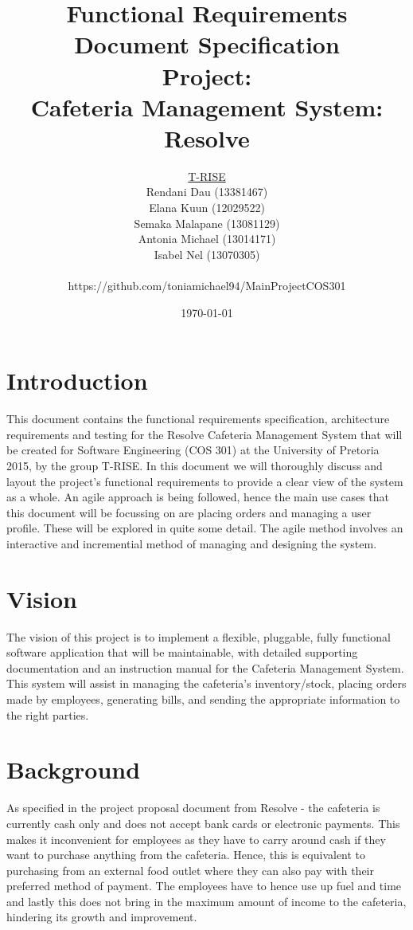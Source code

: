 \documentclass[a4paper,12pt]{article}
\title{\Huge Functional Requirements Document Specification \\ 
	 Project: \\ 
	Cafeteria Management System: Resolve}
\author{
         \underline{T-RISE}\\
          Rendani Dau (13381467) \\
	Elana Kuun (12029522) \\
	Semaka Malapane (13081129) \\
	Antonia Michael (13014171) \\
	Isabel Nel (13070305)\\ \\
	https://github.com/toniamichael94/MainProjectCOS301}
\date{\today}
\begin{document}
\maketitle
\break

\tableofcontents
\break


\section{Introduction}
This document contains the functional requirements specification, architecture requirements and testing for the Resolve Cafeteria Management System that will be created for Software Engineering (COS 301) at the University of Pretoria 2015, by the group T-RISE. In this document we will thoroughly discuss and layout the project's functional requirements to provide a clear view of the system as a whole. An agile approach is being followed, hence the main use cases that this document will be focussing on are placing orders and managing a user profile. These will be explored in quite some detail.  The agile method involves an interactive and incremential method of managing and designing the system. 
\section{Vision}
The vision of this project is to implement a flexible, pluggable, fully functional software application that will be maintainable, with detailed supporting documentation and an instruction manual for the Cafeteria Management System. This system will assist in managing the cafeteria's inventory/stock, placing orders made by employees, generating bills, and sending the appropriate information to the right parties.  

\section{Background}
As specified in the project proposal document from Resolve - the cafeteria is currently cash only and does not accept bank cards or electronic payments. This makes it inconvenient for employees as they have to carry around cash if they want to purchase anything from the cafeteria. Hence, this is equivalent to purchasing from an external food outlet where they can also pay with their preferred method of payment. The employees have to hence use up fuel and time and lastly this does not bring in the maximum amount of income to the cafeteria, hindering its growth and improvement.\\
\end{document}
